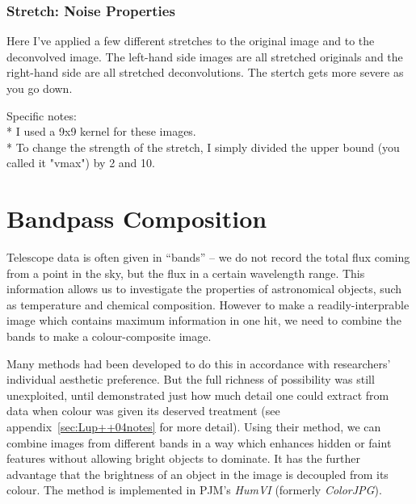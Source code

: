\documentclass[letterpaper, 11pt]{article}
\begin{document}
\subsubsection{Stretch: Noise Properties}

Here I've applied a few different stretches to the original image and to the deconvolved image. The left-hand side images are all stretched originals and the right-hand side are all stretched deconvolutions. The stertch gets more severe as you go down.


Specific notes:\\
* I used a 9x9 kernel for these images.\\
* To change the strength of the stretch, I simply divided the upper bound (you called it "vmax") by 2 and 10.\\




\newpage
\section{Bandpass Composition}
\label{sec:colour}

Telescope data is often given in ``bands'' -- we do not record the total flux coming from a point in the sky, but the flux in a certain wavelength range. This information allows us to investigate the properties of astronomical objects, such as temperature and chemical composition. However to make a readily-interprable image which contains maximum information in one hit, we need to combine the bands to make a colour-composite image.

Many methods had been developed to do this in accordance with researchers' individual aesthetic preference. But the full richness of possibility was still unexploited, until \citet{Lup++04} demonstrated just how much detail one could extract from data when colour was given its deserved treatment (see appendix~\ref{sec:Lup++04notes} for more detail). Using their method, we can combine images from different bands in a way which enhances hidden or faint features without allowing bright objects to dominate. It has the further advantage that the brightness of an object in the image is decoupled from its colour. The method is implemented in PJM's \emph{HumVI} (formerly \emph{ColorJPG}).
\end{document}
